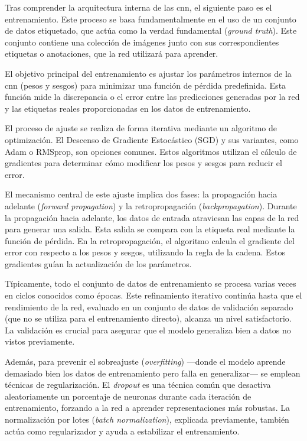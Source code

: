 \documentclass[11pt,spanish,listoffigures,listoftables]{tfgetsinf}
\begin{document}
Tras comprender la arquitectura interna de las \gls{cnn}, el siguiente paso es el entrenamiento. Este proceso se basa fundamentalmente en el uso de un conjunto de datos etiquetado, que actúa como la verdad fundamental (\textit{ground truth}). Este conjunto contiene una colección de imágenes junto con sus correspondientes etiquetas o anotaciones, que la red utilizará para aprender.

El objetivo principal del entrenamiento es ajustar los parámetros internos de la \gls{cnn} (pesos y sesgos) para minimizar una función de pérdida predefinida. Esta función mide la discrepancia o el error entre las predicciones generadas por la red y las etiquetas reales proporcionadas en los datos de entrenamiento.

El proceso de ajuste se realiza de forma iterativa mediante un algoritmo de optimización. El Descenso de Gradiente Estocástico (SGD) y sus variantes, como Adam o RMSprop, son opciones comunes. Estos algoritmos utilizan el cálculo de gradientes para determinar cómo modificar los pesos y sesgos para reducir el error.

El mecanismo central de este ajuste implica dos fases: la propagación hacia adelante (\textit{forward propagation}) y la retropropagación (\textit{backpropagation}). Durante la propagación hacia adelante, los datos de entrada atraviesan las capas de la red para generar una salida. Esta salida se compara con la etiqueta real mediante la función de pérdida. En la retropropagación, el algoritmo calcula el gradiente del error con respecto a los pesos y sesgos, utilizando la regla de la cadena. Estos gradientes guían la actualización de los parámetros.

Típicamente, todo el conjunto de datos de entrenamiento se procesa varias veces en ciclos conocidos como épocas. Este refinamiento iterativo continúa hasta que el rendimiento de la red, evaluado en un conjunto de datos de validación separado (que no se utiliza para el entrenamiento directo), alcanza un nivel satisfactorio. La validación es crucial para asegurar que el modelo generaliza bien a datos no vistos previamente.

Además, para prevenir el sobreajuste (\textit{overfitting}) —donde el modelo aprende demasiado bien los datos de entrenamiento pero falla en generalizar— se emplean técnicas de regularización. El \textit{dropout} es una técnica común que desactiva aleatoriamente un porcentaje de neuronas durante cada iteración de entrenamiento, forzando a la red a aprender representaciones más robustas. La normalización por lotes (\textit{batch normalization}), explicada previamente, también actúa como regularizador y ayuda a estabilizar el entrenamiento.
\end{document}
